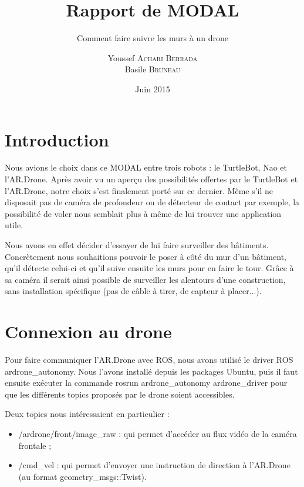\documentclass[titlepage,11pt,a4paper]{article}
\title{Rapport de MODAL}
\subtitle{Comment faire suivre les murs à un drone}
\author{Youssef \textsc{Achari Berrada}\\
Basile \textsc{Bruneau}}
\date{Juin 2015}
\begin{document}
\maketitle



\section*{Introduction}
Nous avions le choix dans ce MODAL entre trois robots : le TurtleBot, Nao et l'AR.Drone. Après avoir vu un aperçu des possibilités offertes par le TurtleBot et l'AR.Drone, notre choix s'est finalement porté sur ce dernier. Même s'il ne disposait pas de caméra de profondeur ou de détecteur de contact par exemple, la possibilité de voler nous semblait plus à même de lui trouver une application utile.

Nous avons en effet décider d'essayer de lui faire surveiller des bâtiments. Concrètement nous souhaitions pouvoir le poser à côté du mur d'un bâtiment, qu'il détecte celui-ci et qu'il suive ensuite les murs pour en faire le tour. Grâce à sa caméra il serait ainsi possible de surveiller les alentours d'une construction, sans installation spécifique (pas de câble à tirer, de capteur à placer...).

\renewcommand{\contentsname}{Sommaire}
\tableofcontents
\listoffigures
\newpage

\section{Connexion au drone}
Pour faire communiquer l'AR.Drone avec ROS, nous avons utilisé le driver ROS ardrone\_autonomy. Nous l'avons installé depuis les packages Ubuntu, puis il faut ensuite exécuter la commande rosrun ardrone\_autonomy ardrone\_driver pour que les différents topics proposés par le drone soient accessibles.

Deux topics nous intéressaient en particulier :
\begin{itemize}
	\item /ardrone/front/image\_raw : qui permet d'accéder au flux vidéo de la caméra frontale ;
	\item /cmd\_vel : qui permet d'envoyer une instruction de direction à l'AR.Drone (au format geometry\_msgs::Twist).
\end{itemize}
\end{document}
